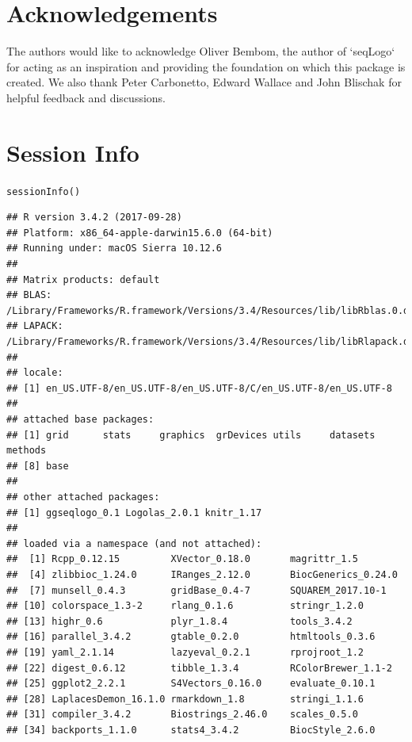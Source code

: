 \documentclass[12pt]{article}\usepackage[]{graphicx}\usepackage[usenames,dvipsnames]{color}
\newcommand{\hlstd}[1]{\textcolor[rgb]{0.251,0.251,0.251}{#1}}%
\newcommand{\hlkwd}[1]{\textcolor[rgb]{0.878,0.439,0.125}{#1}}%
\newenvironment{knitrout}{}{} %
\begin{document}
\section{Acknowledgements}

The authors would like to acknowledge Oliver Bembom, the author of `seqLogo` for acting as an inspiration and providing the foundation on which this package is created. We also thank Peter Carbonetto, Edward Wallace and John Blischak for helpful feedback and discussions.

\section{Session Info}

\begin{knitrout}
\color{fgcolor}\begin{kframe}
\begin{alltt}
\hlkwd{sessionInfo}\hlstd{()}
\end{alltt}
\begin{verbatim}
## R version 3.4.2 (2017-09-28)
## Platform: x86_64-apple-darwin15.6.0 (64-bit)
## Running under: macOS Sierra 10.12.6
## 
## Matrix products: default
## BLAS: /Library/Frameworks/R.framework/Versions/3.4/Resources/lib/libRblas.0.dylib
## LAPACK: /Library/Frameworks/R.framework/Versions/3.4/Resources/lib/libRlapack.dylib
## 
## locale:
## [1] en_US.UTF-8/en_US.UTF-8/en_US.UTF-8/C/en_US.UTF-8/en_US.UTF-8
## 
## attached base packages:
## [1] grid      stats     graphics  grDevices utils     datasets  methods  
## [8] base     
## 
## other attached packages:
## [1] ggseqlogo_0.1 Logolas_2.0.1 knitr_1.17   
## 
## loaded via a namespace (and not attached):
##  [1] Rcpp_0.12.15         XVector_0.18.0       magrittr_1.5        
##  [4] zlibbioc_1.24.0      IRanges_2.12.0       BiocGenerics_0.24.0 
##  [7] munsell_0.4.3        gridBase_0.4-7       SQUAREM_2017.10-1   
## [10] colorspace_1.3-2     rlang_0.1.6          stringr_1.2.0       
## [13] highr_0.6            plyr_1.8.4           tools_3.4.2         
## [16] parallel_3.4.2       gtable_0.2.0         htmltools_0.3.6     
## [19] yaml_2.1.14          lazyeval_0.2.1       rprojroot_1.2       
## [22] digest_0.6.12        tibble_1.3.4         RColorBrewer_1.1-2  
## [25] ggplot2_2.2.1        S4Vectors_0.16.0     evaluate_0.10.1     
## [28] LaplacesDemon_16.1.0 rmarkdown_1.8        stringi_1.1.6       
## [31] compiler_3.4.2       Biostrings_2.46.0    scales_0.5.0        
## [34] backports_1.1.0      stats4_3.4.2         BiocStyle_2.6.0
\end{verbatim}
\end{kframe}
\end{knitrout}
\end{document}
